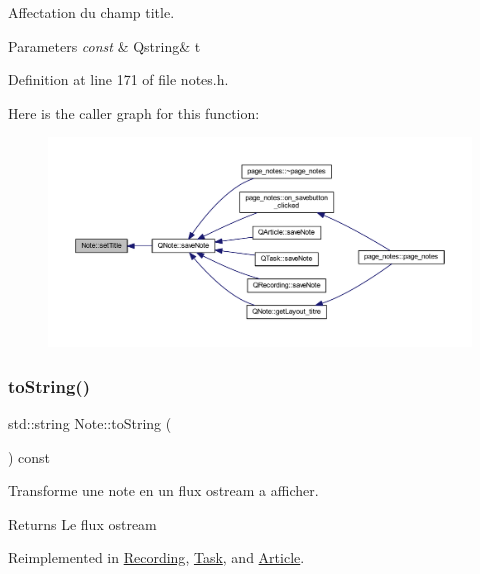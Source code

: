Affectation du champ title. 


\begin{DoxyParams}{Parameters}
{\em const} & Qstring\& t \\
\hline
\end{DoxyParams}


Definition at line 171 of file notes.\+h.

Here is the caller graph for this function\+:\nopagebreak
\begin{figure}[H]
\begin{center}
\leavevmode
\includegraphics[width=350pt]{class_note_ab1a8b5e69f3f23ed460f4761c9d4863d_icgraph}
\end{center}
\end{figure}
\mbox{\label{class_note_a1bd4acfbde0b71d05fd7d4ca889bca2b}} 
\subsubsection{\texorpdfstring{to\+String()}{toString()}}
{\footnotesize\ttfamily std\+::string Note\+::to\+String (\begin{DoxyParamCaption}{ }\end{DoxyParamCaption}) const\hspace{0.3cm}{\ttfamily [virtual]}}



Transforme une note en un flux ostream a afficher. 

\begin{DoxyReturn}{Returns}
Le flux ostream 
\end{DoxyReturn}


Reimplemented in \hyperlink{class_recording_a9f403a39bec2db40c9171a6c3a20942d}{Recording}, \hyperlink{class_task_a7fe5cb7b57a21693e7abfea2f9618563}{Task}, and \hyperlink{class_article_ae40d268ecffbaaa549968a81ea609ba4}{Article}.



